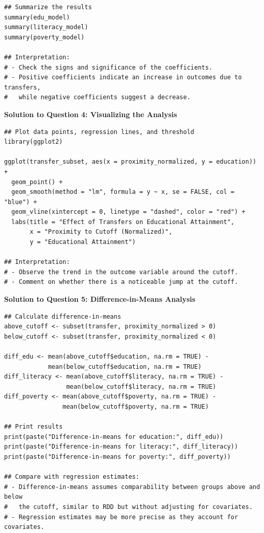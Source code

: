 \documentclass[12pt]{article}
\begin{document}
{\begin{verbatim}
## Summarize the results
summary(edu_model)
summary(literacy_model)
summary(poverty_model)

## Interpretation:
# - Check the signs and significance of the coefficients.
# - Positive coefficients indicate an increase in outcomes due to transfers,
#   while negative coefficients suggest a decrease.
\end{verbatim}

\textbf{Solution to Question 4: Visualizing the Analysis}
\begin{verbatim}
## Plot data points, regression lines, and threshold
library(ggplot2)

ggplot(transfer_subset, aes(x = proximity_normalized, y = education)) +
  geom_point() +
  geom_smooth(method = "lm", formula = y ~ x, se = FALSE, col = "blue") +
  geom_vline(xintercept = 0, linetype = "dashed", color = "red") +
  labs(title = "Effect of Transfers on Educational Attainment",
       x = "Proximity to Cutoff (Normalized)",
       y = "Educational Attainment")

## Interpretation:
# - Observe the trend in the outcome variable around the cutoff.
# - Comment on whether there is a noticeable jump at the cutoff.
\end{verbatim}

\textbf{Solution to Question 5: Difference-in-Means Analysis}
\begin{verbatim}
## Calculate difference-in-means
above_cutoff <- subset(transfer, proximity_normalized > 0)
below_cutoff <- subset(transfer, proximity_normalized < 0)

diff_edu <- mean(above_cutoff$education, na.rm = TRUE) - 
            mean(below_cutoff$education, na.rm = TRUE)
diff_literacy <- mean(above_cutoff$literacy, na.rm = TRUE) - 
                 mean(below_cutoff$literacy, na.rm = TRUE)
diff_poverty <- mean(above_cutoff$poverty, na.rm = TRUE) - 
                mean(below_cutoff$poverty, na.rm = TRUE)

## Print results
print(paste("Difference-in-means for education:", diff_edu))
print(paste("Difference-in-means for literacy:", diff_literacy))
print(paste("Difference-in-means for poverty:", diff_poverty))

## Compare with regression estimates:
# - Difference-in-means assumes comparability between groups above and below
#   the cutoff, similar to RDD but without adjusting for covariates.
# - Regression estimates may be more precise as they account for covariates.
\end{verbatim}

}
\end{document}

